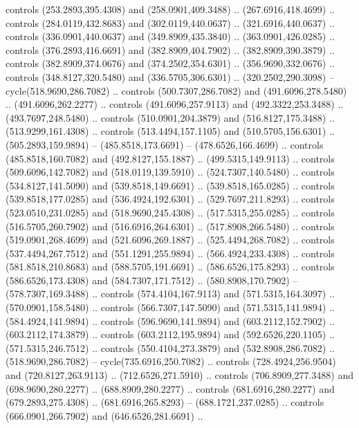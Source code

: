 {{\begin{scope}[y=-0.80pt,x=0.80pt,scale=0.038,xshift=-640pt,yshift=120pt]
        controls (253.2893,395.4308) and (258.0901,409.3488) .. (267.6916,418.4699) ..
        controls (284.0119,432.8683) and (302.0119,440.0637) .. (321.6916,440.0637) ..
        controls (336.0901,440.0637) and (349.8909,435.3840) .. (363.0901,426.0285) ..
        controls (376.2893,416.6691) and (382.8909,404.7902) .. (382.8909,390.3879) ..
        controls (382.8909,374.0676) and (374.2502,354.6301) .. (356.9690,332.0676) ..
        controls (348.8127,320.5480) and (336.5705,306.6301) .. (320.2502,290.3098) --
        cycle(518.9690,286.7082) .. controls (500.7307,286.7082) and
        (491.6096,278.5480) .. (491.6096,262.2277) .. controls (491.6096,257.9113) and
        (492.3322,253.3488) .. (493.7697,248.5480) .. controls (510.0901,204.3879) and
        (516.8127,175.3488) .. (513.9299,161.4308) .. controls (513.4494,157.1105) and
        (510.5705,156.6301) .. (505.2893,159.9894) -- (485.8518,173.6691) --
        (478.6526,166.4699) .. controls (485.8518,160.7082) and (492.8127,155.1887) ..
        (499.5315,149.9113) .. controls (509.6096,142.7082) and (518.0119,139.5910) ..
        (524.7307,140.5480) .. controls (534.8127,141.5090) and (539.8518,149.6691) ..
        (539.8518,165.0285) .. controls (539.8518,177.0285) and (536.4924,192.6301) ..
        (529.7697,211.8293) .. controls (523.0510,231.0285) and (518.9690,245.4308) ..
        (517.5315,255.0285) .. controls (516.5705,260.7902) and (516.6916,264.6301) ..
        (517.8908,266.5480) .. controls (519.0901,268.4699) and (521.6096,269.1887) ..
        (525.4494,268.7082) .. controls (537.4494,267.7512) and (551.1291,255.9894) ..
        (566.4924,233.4308) .. controls (581.8518,210.8683) and (588.5705,191.6691) ..
        (586.6526,175.8293) .. controls (586.6526,173.4308) and (584.7307,171.7512) ..
        (580.8908,170.7902) -- (578.7307,169.3488) .. controls (574.4104,167.9113) and
        (571.5315,164.3097) .. (570.0901,158.5480) .. controls (566.7307,147.5090) and
        (571.5315,141.9894) .. (584.4924,141.9894) .. controls (596.9690,141.9894) and
        (603.2112,152.7902) .. (603.2112,174.3879) .. controls (603.2112,195.9894) and
        (592.6526,220.1105) .. (571.5315,246.7512) .. controls (550.4104,273.3879) and
        (532.8908,286.7082) .. (518.9690,286.7082) -- cycle(735.6916,250.7082) ..
        controls (728.4924,256.9504) and (720.8127,263.9113) .. (712.6526,271.5910) ..
        controls (706.8909,277.3488) and (698.9690,280.2277) .. (688.8909,280.2277) ..
        controls (681.6916,280.2277) and (679.2893,275.4308) .. (681.6916,265.8293) --
        (688.1721,237.0285) .. controls (666.0901,266.7902) and (646.6526,281.6691) ..

\end{scope}}}
